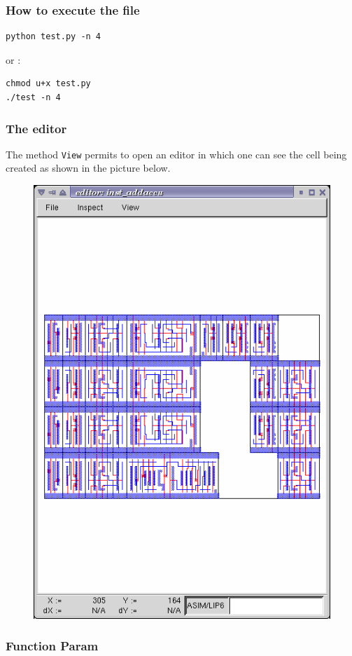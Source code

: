 \subsubsection{How to execute the file}

\begin{verbatim}
python test.py -n 4
\end{verbatim}
\indent or :
\begin{verbatim}
chmod u+x test.py
./test -n 4
\end{verbatim}

\subsubsection{The editor}

The method \verb-View- permits to open an editor in which one can see the cell being created as shown in the picture below.
\begin{figure}[h!]
\centering
\includegraphics[width=.8\textwidth]{./images/editor.png}
\end{figure}

\newpage
\subsubsection{Function Param}

